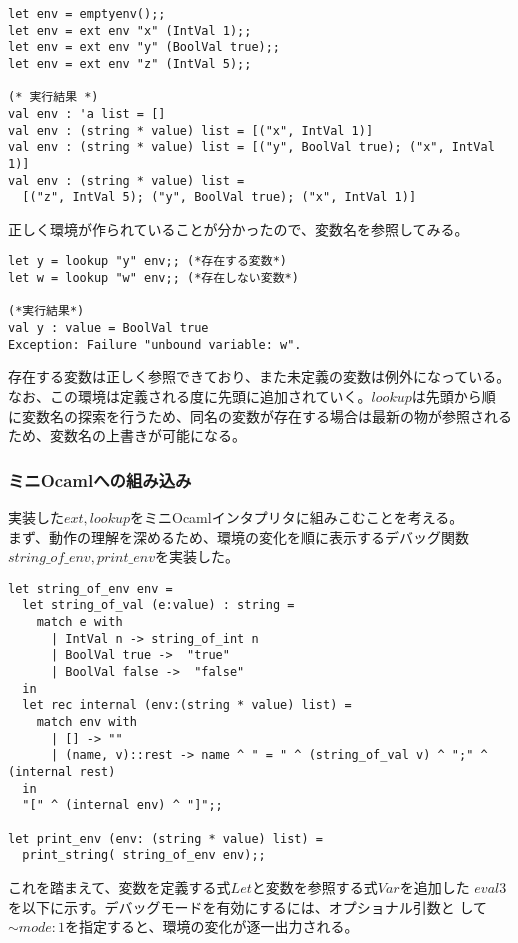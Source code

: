 \documentclass[a4paper,9pt]{jsarticle}
\begin{document}
\begin{lstlisting}
let env = emptyenv();;
let env = ext env "x" (IntVal 1);;
let env = ext env "y" (BoolVal true);;
let env = ext env "z" (IntVal 5);;

(* 実行結果 *)
val env : 'a list = []
val env : (string * value) list = [("x", IntVal 1)]
val env : (string * value) list = [("y", BoolVal true); ("x", IntVal 1)]
val env : (string * value) list =
  [("z", IntVal 5); ("y", BoolVal true); ("x", IntVal 1)]
\end{lstlisting}
正しく環境が作られていることが分かったので、変数名を参照してみる。

\begin{lstlisting}
let y = lookup "y" env;; (*存在する変数*)
let w = lookup "w" env;; (*存在しない変数*)

(*実行結果*)
val y : value = BoolVal true
Exception: Failure "unbound variable: w".
\end{lstlisting}
存在する変数は正しく参照できており、また未定義の変数は例外になっている。\\

なお、この環境は定義される度に先頭に追加されていく。$lookup$は先頭から順
に変数名の探索を行うため、同名の変数が存在する場合は最新の物が参照される
ため、変数名の上書きが可能になる。

\subsubsection{ミニOcamlへの組み込み}
実装した$ext,lookup$をミニOcamlインタプリタに組みこむことを考える。\\
まず、動作の理解を深めるため、環境の変化を順に表示するデバッグ関数
$string\_of\_env, print\_env$を実装した。

\begin{lstlisting}
let string_of_env env =
  let string_of_val (e:value) : string =
    match e with
      | IntVal n -> string_of_int n
      | BoolVal true ->  "true"
      | BoolVal false ->  "false"
  in
  let rec internal (env:(string * value) list) =
    match env with
      | [] -> ""
      | (name, v)::rest -> name ^ " = " ^ (string_of_val v) ^ ";" ^ (internal rest)
  in
  "[" ^ (internal env) ^ "]";;

let print_env (env: (string * value) list) =
  print_string( string_of_env env);;
\end{lstlisting}

これを踏まえて、変数を定義する式$Let$と変数を参照する式$Var$を追加した
$eval3$を以下に示す。デバッグモードを有効にするには、オプショナル引数と
して$\sim mode:1$を指定すると、環境の変化が逐一出力される。
\end{document}
